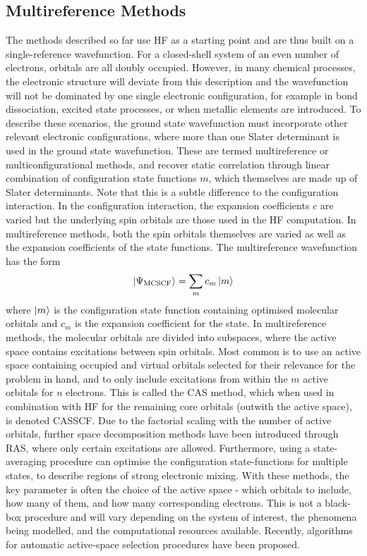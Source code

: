 \subsection{Multireference Methods}\label{section: methods_multiconf}
The methods described so far use \ac{HF} as a starting point and are thus built on a single-reference wavefunction. For a closed-shell system of an even number of electrons, orbitals are all doubly occupied. However, in many chemical processes, the electronic structure will deviate from this description and the wavefunction will not be dominated by one single electronic configuration, for example in bond dissociation, excited state processes, or when metallic elements are introduced. To describe these scenarios, the ground state wavefunction must incorporate other relevant electronic configurations, where more than one Slater determinant is used in the ground state wavefunction. These are termed multireference or multiconfigurational methods, and recover static correlation through linear combination of configuration state functions $m$, which themselves are made up of Slater determinants. Note that this is a subtle difference to the configuration interaction. In the configuration interaction, the expansion coefficients $c$ are varied but the underlying spin orbitals are those used in the \ac{HF} computation. In multireference methods, both the spin orbitals themselves are varied as well as the expansion coefficients of the state functions. The multireference wavefunction has the form
\begin{equation}
    \ket{\Psi_{\mathrm{MCSCF}}}=\sum_{m}c_{m}\ket{m}
\end{equation}
where $\ket{m}$ is the configuration state function containing optimised molecular orbitals and $c_{m}$ is the expansion coefficient for the state. In multireference methods, the molecular orbitals are divided into subspaces, where the active space contains excitations between spin orbitals. Most common is to use an active space containing occupied and virtual orbitals selected for their relevance for the problem in hand, and to only include excitations from within the $m$ active orbitals for $n$  electrons. This is called the \ac{CAS} method, which when used in combination with \ac{HF} for the remaining core orbitals (outwith the active space), is denoted \ac{CASSCF}.\cite{Roos1980} Due to the factorial scaling with the number of active orbitals, further space decomposition methods have been introduced through \ac{RAS}, where only certain excitations are allowed. Furthermore, using a state-averaging procedure can optimise the configuration state-functions for multiple states, to describe regions of strong electronic mixing. With these methods, the key parameter is often the choice of the active space - which orbitals to include, how many of them, and how many corresponding electrons. This is not a black-box procedure and will vary depending on the system of interest, the phenomena being modelled, and the computational resources available.\cite{Lischka2018} Recently, algorithms for automatic active-space selection procedures have been proposed.\cite{Stein2016,Bao2018} 

